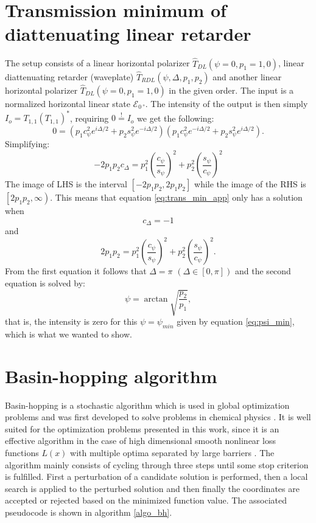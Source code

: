 \section{Transmission minimum of diattenuating linear retarder} %
\label{sec:transmission_min}
The setup consists of a linear horizontal polarizer $\hat{T}_{DL}(\psi=0, p_1=1, 0)$, linear diattenuating retarder (waveplate) $\hat{T}_{RDL}(\psi, \Delta, p_1, p_2)$ and another linear horizontal polarizer $\hat{T}_{DL}(\psi=0, p_1=1, 0)$ in the given order. The input is a normalized horizontal linear state $\bm{\mathcal{E}}_{\SI{0}{\degree}}$. The intensity of the output is then simply $I_o=T_{1,1}(T_{1,1})^*$, requiring $0\overset{!}{=}I_o$ we get the following:
\begin{equation}
    0=(p_1c_\psi^2e^{i\Delta/2}+p_2s_\psi^2e^{-i\Delta/2})(p_1c_\psi^2e^{-i\Delta/2}+p_2s_\psi^2e^{i\Delta/2}).
\end{equation}
Simplifying:
\begin{equation}
    \label{eq:trans_min_app}
    -2p_1p_2c_\Delta = p_1^2\left(\frac{c_\psi}{s_\psi}\right)^2 + p_2^2\left(\frac{s_\psi}{c_\psi}\right)^2
\end{equation}
The image of LHS is the interval $\left[-2p_1p_2, 2p_1p_2\right]$ while the image of the RHS is $\left[2p_1p_2, \infty\right)$. This means that equation \ref{eq:trans_min_app} only has a solution when
\begin{equation}
    c_\Delta=-1
\end{equation}
and
\begin{equation}
    2p_1p_2 = p_1^2\left(\frac{c_\psi}{s_\psi}\right)^2 + p_2^2\left(\frac{s_\psi}{c_\psi}\right)^2.
\end{equation}
From the first equation it follows that $\Delta=\pi$ $(\Delta \in [0,\pi])$ and the second equation is solved by:
\begin{equation}
    \label{eq:psi_min}
    \psi = \arctan \sqrt{\frac{p_2}{p_1}},
\end{equation}
that is, the intensity is zero for this $\psi=\psi_{min}$ given by equation \ref{eq:psi_min}, which is what we wanted to show.

\section{Basin-hopping algorithm}
\label{sec:basin_hopping_algo}

Basin-hopping is a stochastic algorithm which is used in global optimization problems and was first developed to solve problems in chemical physics \cite{Wales1997}. It is well suited for the optimization problems presented in this work, since it is an effective algorithm in the case of high dimensional smooth nonlinear loss functions $L(x)$ with multiple optima separated by large barriers \cite{Olson2012, Wu2020}. The algorithm mainly consists of cycling through three steps until some stop criterion is fulfilled. First a perturbation of a candidate solution is performed, then a local search is applied to the perturbed solution and then finally the coordinates are accepted or rejected based on the minimized function value. The associated pseudocode is shown in algorithm \ref{algo_bh}. 


